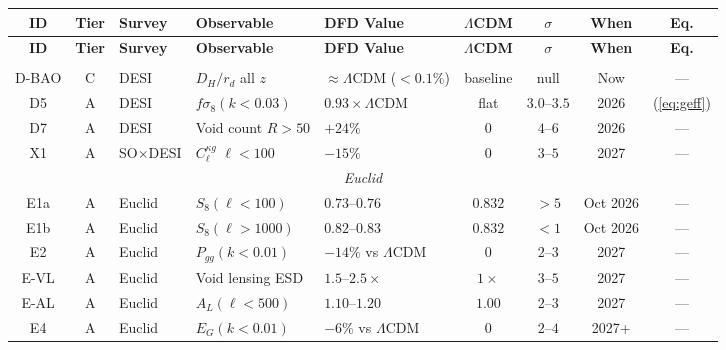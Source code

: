 \documentclass[11pt,a4paper]{article}
\newcommand{\LCDM}{$\Lambda$CDM}
\begin{document}
\footnotesize
\begin{longtable}{@{}cclp{2.5cm}p{2.5cm}cccc@{}}
\toprule
\textbf{ID} & \textbf{Tier} & \textbf{Survey} & \textbf{Observable}
& \textbf{DFD Value} & \textbf{\LCDM}
& \textbf{$\sigma$} & \textbf{When}
& \textbf{Eq.} \\
\midrule
\endfirsthead
\toprule
\textbf{ID} & \textbf{Tier} & \textbf{Survey} & \textbf{Observable}
& \textbf{DFD Value} & \textbf{\LCDM}
& \textbf{$\sigma$} & \textbf{When}
& \textbf{Eq.} \\
\midrule
\endhead
\bottomrule
\endlastfoot

\multicolumn{9}{c}{\textit{DESI DR2}} \\
\midrule

D-BAO & C & DESI & $D_H/r_d$ all $z$ & $\approx$\LCDM{} ($< 0.1\%$)
  & baseline & null & Now & --- \\

D5 & A & DESI & $f\sigma_8(k < 0.03)$ & $0.93 \times$\LCDM
  & flat & $3.0$--$3.5$ & 2026 & (\ref{eq:geff}) \\

D7 & A & DESI & Void count $R > 50$ & $+24\%$ & 0 & $4$--$6$
  & 2026 & --- \\

X1 & A & SO$\times$DESI & $C_\ell^{\kappa g}$ $\ell < 100$
  & $-15\%$ & 0 & $3$--$5$ & 2027 & --- \\

\midrule
\multicolumn{9}{c}{\textit{Euclid}} \\
\midrule

E1a & A & Euclid & $S_8(\ell < 100)$ & $0.73$--$0.76$
  & $0.832$ & $> 5$ & Oct 2026 & --- \\

E1b & A & Euclid & $S_8(\ell > 1000)$ & $0.82$--$0.83$
  & $0.832$ & $< 1$ & Oct 2026 & --- \\

E2 & A & Euclid & $P_{gg}(k < 0.01)$ & $-14\%$ vs \LCDM
  & 0 & $2$--$3$ & 2027 & --- \\

E-VL & A & Euclid & Void lensing ESD & $1.5$--$2.5\times$
  & $1\times$ & $3$--$5$ & 2027 & --- \\

E-AL & A & Euclid & $A_L(\ell < 500)$ & $1.10$--$1.20$
  & $1.00$ & $2$--$3$ & 2027 & --- \\

E4 & A & Euclid & $E_G(k < 0.01)$ & $-6\%$ vs \LCDM
  & 0 & $2$--$4$ & 2027+ & --- \\


\end{longtable}
\end{document}

